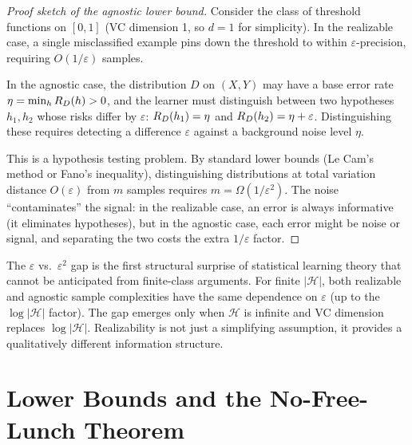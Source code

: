 \begin{proof}[Proof sketch of the agnostic lower bound]
Consider the class of threshold functions on $[0,1]$ (VC dimension 1, so
$d = 1$ for simplicity).  In the realizable case, a single misclassified
example pins down the threshold to within $\varepsilon$-precision, requiring
$O(1/\varepsilon)$ samples.

In the agnostic case, the distribution $D$ on $(X, Y)$ may have a base error
rate $\eta = \min_h R_D(h) > 0$, and the learner must distinguish between
two hypotheses $h_1, h_2$ whose risks differ by $\varepsilon$: $R_D(h_1) =
\eta$ and $R_D(h_2) = \eta + \varepsilon$.  Distinguishing these requires
detecting a difference $\varepsilon$ against a background noise level $\eta$.

This is a hypothesis testing problem.  By standard lower bounds (Le Cam's
method or Fano's inequality), distinguishing distributions at total variation
distance $O(\varepsilon)$ from $m$ samples requires
$m = \Omega(1/\varepsilon^2)$.  The noise ``contaminates'' the signal: in the
realizable case, an error is always informative (it eliminates hypotheses),
but in the agnostic case, each error might be noise or signal, and separating
the two costs the extra $1/\varepsilon$ factor.
\end{proof}

\begin{remark}
\label{rmk:revelation}
The $\varepsilon$ vs.\ $\varepsilon^2$ gap is the first structural surprise of
statistical learning theory that cannot be anticipated from finite-class
arguments.  For finite $|\mathcal{H}|$, both realizable and agnostic sample
complexities have the same dependence on $\varepsilon$ (up to the
$\log|\mathcal{H}|$ factor).  The gap emerges only when $\mathcal{H}$ is
infinite and VC dimension replaces $\log|\mathcal{H}|$.  Realizability is
not just a simplifying assumption, it provides a qualitatively different
information structure.
\end{remark}



\section{Lower Bounds and the No-Free-Lunch Theorem}
\label{sec:lower-bounds}

